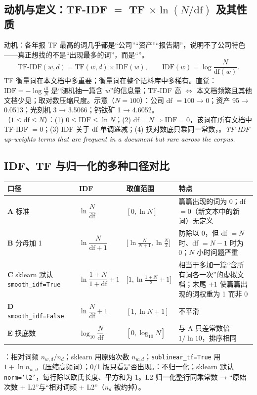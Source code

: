 \subsection{\texorpdfstring{动机与定义：TF-IDF $=$ TF $\times\ln(N/\mathrm{df})$ 及其性质}{动机与定义：TF-IDF = TF × ln(N/df) 及其性质}}
动机：各年报 TF 最高的词几乎都是“公司”“资产”“报告期”，说明不了公司特色——真正想找的不是“出现最多的词”，而是“”。
\[
\mathrm{TF\text{-}IDF}(w,d)=\mathrm{TF}(w,d)\times\mathrm{IDF}(w),\qquad \mathrm{IDF}(w)=\log\frac{N}{\mathrm{df}(w)} .
\]
TF 衡量词在本文档中多重要；衡量词在整个语料库中多稀有。直觉：$\mathrm{IDF}=-\log\frac{\mathrm{df}}{N}$ 是“随机抽一篇含 $w$”的信息量；TF-IDF 高 $\Leftrightarrow$ 本文档频繁且其他文档少见；取对数压缩尺度。示意（$N=100$）：公司 df $=100$ → 0；资产 95 → 0.0513；光刻机 3 → 3.5066；钙钛矿 1 → 4.6052。\\
（$1\le\mathrm{df}\le N$）：(1) $0\le\mathrm{IDF}\le\ln N$；(2) $\mathrm{df}=N\Rightarrow\mathrm{IDF}=0$，该词在所有文档中 TF-IDF $=0$；(3) IDF 关于 df 单调递减；(4) 换对数底只乘同一常数，。\textit{TF-IDF up-weights terms that are frequent in a document but rare across the corpus.}

\subsection{IDF、TF 与归一化的多种口径对比}
\begin{tabD08a}
\begin{tabularx}{\linewidth}{@{}p{2.6cm}p{2.5cm}p{3.1cm}L@{}}
\toprule
口径 & IDF & 取值范围 & 特点 \\
\midrule
\textbf{A} 标准 & $\ln\dfrac{N}{\mathrm{df}}$ & $[0,\ln N]$ & 篇篇出现的词为 0；df $=0$（新文本中的新词）无定义 \\
\textbf{B} 分母加 1 & $\ln\dfrac{N}{\mathrm{df}+1}$ & $\big[\ln\frac{N}{N+1},\ln\frac N2\big]$ & 防除以 0，但 df $=N$ 时、df $=N-1$ 时为 0；$N$ 小时问题严重 \\
\textbf{C} sklearn 默认 \texttt{smooth\_idf=True} & $\ln\dfrac{1+N}{1+\mathrm{df}}+1$ & $\big[1,\ln\frac{1+N}{2}+1\big]$ & 相当于多加一篇“含所有词各一次”的虚拟文档；末尾 $+1$ 使篇篇出现的词权重为 1 而非 0 \\
\textbf{D} \texttt{smooth\_idf=False} & $\ln\dfrac{N}{\mathrm{df}}+1$ & $[1,\ln N+1]$ & 不平滑 \\
\textbf{E} 换底数 & $\log_{10}\dfrac{N}{\mathrm{df}}$ & $[0,\log_{10}N]$ & 与 A 只差常数倍 $1/\ln10$，排序相同 \\
\bottomrule
\end{tabularx}
\end{tabD08a}
：相对词频 $n_{w,d}/n_d$；sklearn 用原始次数 $n_{w,d}$；\texttt{sublinear\_tf=True} 用 $1+\ln n_{w,d}$（压缩高频词）；0/1 版只看是否出现。：不归一化；sklearn 默认 \texttt{norm='l2'}，每行除以欧氏长度、平方和为 1。L2 归一化整行同乘常数 → “原始次数 + L2”与“相对词频 + L2”（$n_d$ 被约掉）。

